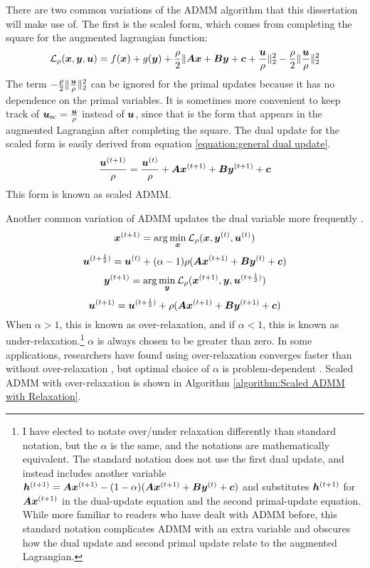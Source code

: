 There are two common variations of the ADMM algorithm that this dissertation will make use of.  The first is the scaled form, which comes from completing the square for the augmented lagrangian function:
%
\begin{equation}
\mathcal{L}_{\rho}(\bm{x},\bm{y},\bm{u}) = f(\bm{x}) + g(\bm{y}) + \frac{\rho}{2}\|\bm{A}\bm{x} + \bm{B}\bm{y} + \bm{c} + \frac{\bm{u}}{\rho}\|_2^2 - \frac{\rho}{2}\|\frac{\bm{u}}{\rho}\|_2^2
\end{equation}
%
The term $-\frac{\rho}{2}\|\frac{\bm{u}}{\rho}\|_2^2$ can be ignored for the primal updates because it has no dependence on the primal variables. It is sometimes more convenient to keep track of $\bm{u}_{\text{sc}} = \frac{\bm{u}}{\rho}$ instead of $\bm{u}$, since that is the form that appears in the augmented Lagrangian after completing the square. The dual update for the scaled form is easily derived from equation \ref{equation:general dual update}.
%
\begin{equation}
\frac{\bm{u}^{(t + 1)}}{\rho} = \frac{\bm{u}^{(t)}}{\rho} + \bm{A}\bm{x}^{(t + 1)} + \bm{B}\bm{y}^{(t + 1)} + \bm{c}
\end{equation}
%
This form is known as scaled ADMM.

Another common variation of ADMM updates the dual variable more frequently \cite{eckstein1994parallel}.
\begin{equation}
\bm{x}^{(t + 1)} = \arg\min_{\bm{x}} \mathcal{L}_{\rho}(\bm{x},\bm{y}^{(t)},\bm{u}^{(t)})
\end{equation}
%
\begin{equation}
\bm{u}^{(t + \frac{1}{2})} = \bm{u}^{(t)} + (\alpha - 1)\rho(\bm{A}\bm{x}^{(t + 1)} + \bm{B}\bm{y}^{(t)} + \bm{c})
\end{equation}
%
\begin{equation}
\bm{y}^{(t + 1)} = \arg\min_{\bm{y}} \mathcal{L}_{\rho}(\bm{x}^{(t + 1)},\bm{y},\bm{u}^{(t + \frac{1}{2})})
\end{equation}
%
\begin{equation}
\bm{u}^{(t + 1)} = \bm{u}^{(t + \frac{1}{2})} + \rho(\bm{A}\bm{x}^{(t + 1)} + \bm{B}\bm{y}^{(t + 1)} + \bm{c})
\end{equation}
%
When $\alpha > 1$, this is known as over-relaxation, and if $\alpha < 1$, this is known as under-relaxation.\footnote{I have elected to notate over/under relaxation differently than standard notation, but the $\alpha$ is the same, and the notations are mathematically equivalent. The standard notation does not use the first dual update, and instead includes another variable $\bm{h}^{(t + 1)} = \bm{A}\bm{x}^{(t + 1)} - (1 - \alpha)(\bm{A}\bm{x}^{(t + 1)} + \bm{B}\bm{y}^{(t)} + \bm{c})$ and substitutes $\bm{h}^{(t + 1)}$ for $\bm{A}\bm{x}^{(t + 1)}$ in the dual-update equation and the second primal-update equation. While more familiar to readers who have dealt with ADMM before, this standard notation complicates ADMM with an extra variable and obscures how the dual update and second primal update relate to the augmented Lagrangian.} $\alpha$ is always chosen to be greater than zero. In some applications, researchers have found using over-relaxation converges faster than without over-relaxation \cite{eckstein1994parallel}, but optimal choice of $\alpha$ is problem-dependent \cite{nishihara2015general}. Scaled ADMM with over-relaxation is shown in Algorithm \ref{algorithm:Scaled ADMM with Relaxation}.

